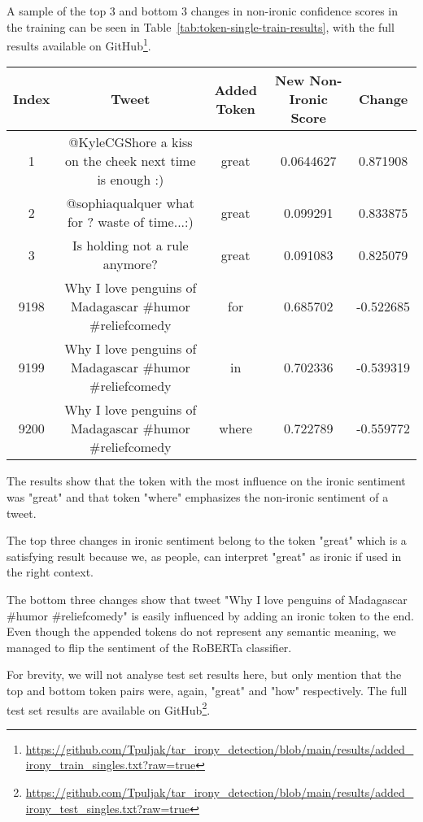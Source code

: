 \documentclass[10pt, a4paper]{article}
\begin{document}
A sample of the top 3 and bottom 3 changes in non-ironic confidence scores in the training can be seen in Table~\ref{tab:token-single-train-results}, with the full results available on GitHub\footnote{\url{https://github.com/Tpuljak/tar_irony_detection/blob/main/results/added_irony_train_singles.txt?raw=true}}.

\begin{table*}
\caption{Sample of Single Token Results on the Train Set}
\label{tab:token-single-train-results}
\begin{center}
\begin{tabular}{c|c|c|c|c}
\toprule
Index & Tweet & Added Token & New Non-Ironic Score & Change\\
\midrule
1     & @KyleCGShore a kiss on the cheek next time is enough :)   & great & 0.0644627 & 0.871908 \\
2     & @sophiaqualquer what for ? waste of time...:)             & great & 0.099291  & 0.833875 \\
3     & Is holding not a rule anymore?                            & great & 0.091083  & 0.825079 \\
9198  & Why I love penguins of Madagascar  \#humor \#reliefcomedy & for   & 0.685702  & -0.522685 \\
9199  & Why I love penguins of Madagascar  \#humor \#reliefcomedy & in    & 0.702336  & -0.539319 \\
9200  & Why I love penguins of Madagascar  \#humor \#reliefcomedy & where & 0.722789  & -0.559772 \\
\bottomrule
\end{tabular}
\end{center}
\end{table*}
  
The results show that the token with the most influence on the ironic sentiment was "great" and that token "where" emphasizes the non-ironic sentiment of a tweet.

The top three changes in ironic sentiment belong to the token "great" which is a satisfying result because we, as people, can interpret "great" as ironic if used in the right context.

The bottom three changes show that tweet "Why I love penguins of Madagascar  \#humor \#reliefcomedy" is easily influenced by adding an ironic token to the end.
Even though the appended tokens do not represent any semantic meaning, we managed to flip the sentiment of the RoBERTa classifier.

For brevity, we will not analyse test set results here, but only mention that the top and bottom token pairs were, again, "great" and "how" respectively.
The full test set results are available on GitHub\footnote{\url{https://github.com/Tpuljak/tar_irony_detection/blob/main/results/added_irony_test_singles.txt?raw=true}}.
\end{document}
